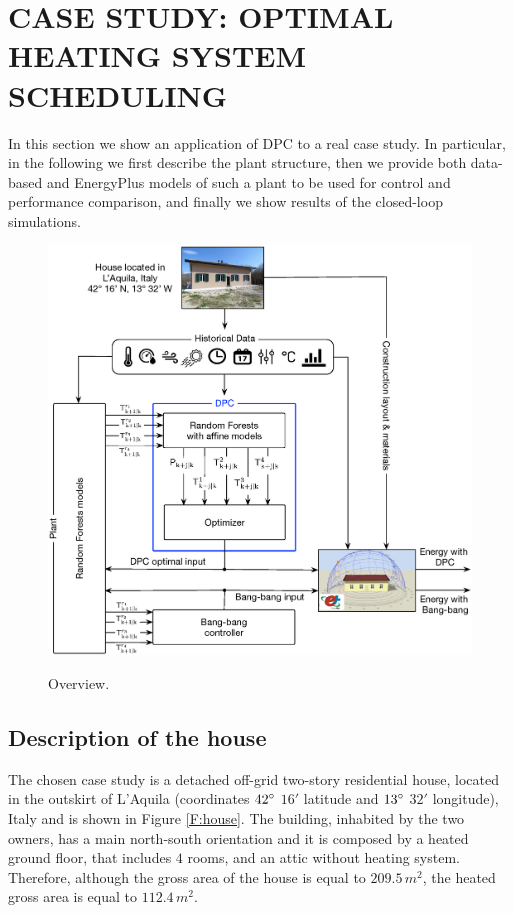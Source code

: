 \section{CASE STUDY: OPTIMAL HEATING SYSTEM SCHEDULING}
\label{S:realCaseStudy}

In this section we show an application of DPC to a real case study. In particular, in the following we first describe the plant structure, then we provide both data-based and EnergyPlus models of such a plant to be used for control and performance comparison, and finally we show results of the closed-loop simulations.

\begin{figure}[h!]
	\begin{center}
		\includegraphics[width=1\linewidth]{figures/overview.eps}
		\caption{Overview.}
		\captionsetup{justification=centering}
		\label{F:overview}
	\end{center}
\end{figure}

\subsection{Description of the house}\label{SS:descriptionHouse}
The chosen case study is a detached off-grid two-story residential house, located in the outskirt of L'Aquila (coordinates $42\degree$ $16'$ latitude and $13\degree$ $32'$ longitude), Italy and is shown in Figure \ref{F:house}. The building, inhabited by the two owners, has a main north-south orientation and it is composed by a heated ground floor, that includes $4$ rooms, and an attic without heating system. Therefore, although the gross area of the house is equal to $209.5\,m^2$, the heated gross area is equal to $112.4\,m^2$. 


